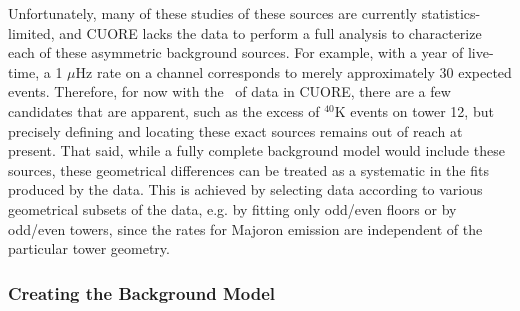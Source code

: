 Unfortunately, many of these studies of these sources are currently statistics-limited, and CUORE lacks the data to perform a full analysis to characterize each of these asymmetric background sources.
For example, with a year of live-time, a 1 $\mu$Hz rate on a channel corresponds to merely approximately 30 expected events.
Therefore, for now with the \livetime~of data in CUORE, there are a few candidates that are apparent, such as the excess of $^{40}$K events on tower 12, but precisely defining and locating these exact sources remains out of reach at present.
That said, while a fully complete background model would include these sources, these geometrical differences can be treated as a systematic in the fits produced by the data.
This is achieved by selecting data according to various geometrical subsets of the data, e.g. by fitting only odd/even floors or by odd/even towers, since the rates for Majoron emission are independent of the particular tower geometry.

\subsubsection*{Creating the Background Model}

